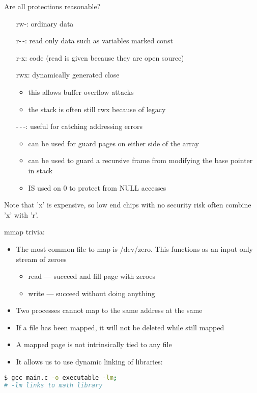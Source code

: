 \documentclass[../../lecture_notes.tex]{subfiles}
\begin{document}
Are all protections reasonable?
\begin{enumerate}
\item[rw-:] ordinary data
\item[r-\,-:] read only data such as variables marked const
\item[r-x:] code (read is given because they are open source)
\item[rwx:] dynamically generated close
	\begin{itemize}
		\item this allows buffer overflow attacks
		\item the stack is often still rwx because of legacy
	\end{itemize}
\item[-\,-\,-:] useful for catching addressing errors
	\begin{itemize}
		\item can be used for guard pages on either side of the array
		\item can be used to guard a recursive frame from modifying the base pointer in stack
		\item IS used on 0 to protect from NULL accesses
	\end{itemize}
\end{enumerate}
Note that 'x' is expensive, so low end chips with no security risk often combine 'x' with 'r'.


mmap trivia:
\begin{itemize}
\item The most common file to map is /dev/zero. This functions as an input only stream of zeroes
\begin{itemize}
	\item read --- succeed and fill page with zeroes
	\item write --- succeed without doing anything
\end{itemize}
\item Two processes cannot map to the same address at the same
\item If a file has been mapped, it will not be deleted while still mapped
\item A mapped page is not intrinsically tied to any file
\item It allows us to use dynamic linking of libraries:
\end{itemize}
\begin{lstlisting}[language=sh]
$ gcc main.c -o executable -lm;
# -lm links to math library
\end{lstlisting}
\end{document}
